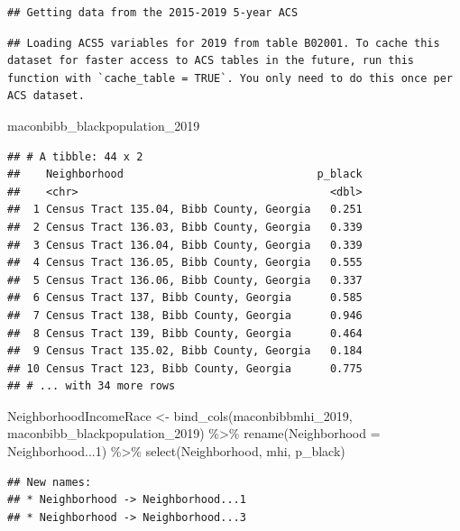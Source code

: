 \documentclass[
]{article}
\newenvironment{Shaded}{\begin{snugshade}}{\end{snugshade}}
\newcommand{\AttributeTok}[1]{\textcolor[rgb]{0.77,0.63,0.00}{#1}}
\newcommand{\DecValTok}[1]{\textcolor[rgb]{0.00,0.00,0.81}{#1}}
\newcommand{\FunctionTok}[1]{\textcolor[rgb]{0.00,0.00,0.00}{#1}}
\newcommand{\NormalTok}[1]{#1}
\newcommand{\OtherTok}[1]{\textcolor[rgb]{0.56,0.35,0.01}{#1}}
\newcommand{\SpecialCharTok}[1]{\textcolor[rgb]{0.00,0.00,0.00}{#1}}
\begin{document}
\begin{verbatim}
## Getting data from the 2015-2019 5-year ACS
\end{verbatim}

\begin{verbatim}
## Loading ACS5 variables for 2019 from table B02001. To cache this dataset for faster access to ACS tables in the future, run this function with `cache_table = TRUE`. You only need to do this once per ACS dataset.
\end{verbatim}

\begin{Shaded}
\begin{Highlighting}[]
\NormalTok{maconbibb\_blackpopulation\_2019}
\end{Highlighting}
\end{Shaded}

\begin{verbatim}
## # A tibble: 44 x 2
##    Neighborhood                              p_black
##    <chr>                                       <dbl>
##  1 Census Tract 135.04, Bibb County, Georgia   0.251
##  2 Census Tract 136.03, Bibb County, Georgia   0.339
##  3 Census Tract 136.04, Bibb County, Georgia   0.339
##  4 Census Tract 136.05, Bibb County, Georgia   0.555
##  5 Census Tract 136.06, Bibb County, Georgia   0.337
##  6 Census Tract 137, Bibb County, Georgia      0.585
##  7 Census Tract 138, Bibb County, Georgia      0.946
##  8 Census Tract 139, Bibb County, Georgia      0.464
##  9 Census Tract 135.02, Bibb County, Georgia   0.184
## 10 Census Tract 123, Bibb County, Georgia      0.775
## # ... with 34 more rows
\end{verbatim}

\begin{Shaded}
\begin{Highlighting}[]
\NormalTok{NeighborhoodIncomeRace }\OtherTok{\textless{}{-}} \FunctionTok{bind\_cols}\NormalTok{(maconbibbmhi\_2019, maconbibb\_blackpopulation\_2019) }\SpecialCharTok{\%\textgreater{}\%} 
 \FunctionTok{rename}\NormalTok{(}\AttributeTok{Neighborhood =}\NormalTok{ Neighborhood...}\DecValTok{1}\NormalTok{) }\SpecialCharTok{\%\textgreater{}\%}
 \FunctionTok{select}\NormalTok{(Neighborhood, mhi, p\_black) }
\end{Highlighting}
\end{Shaded}

\begin{verbatim}
## New names:
## * Neighborhood -> Neighborhood...1
## * Neighborhood -> Neighborhood...3
\end{verbatim}
\end{document}
